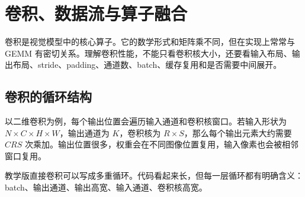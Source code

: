 \chapter{卷积、数据流与算子融合}

卷积是视觉模型中的核心算子。它的数学形式和矩阵乘不同，但在实现上常常与 GEMM 有密切关系。理解卷积性能，不能只看卷积核大小，还要看输入布局、输出布局、stride、padding、通道数、batch、缓存复用和是否需要中间展开。

\section{卷积的循环结构}

以二维卷积为例，每个输出位置会遍历输入通道和卷积核窗口。若输入形状为 $N \times C \times H \times W$，输出通道为 $K$，卷积核为 $R \times S$，那么每个输出元素大约需要 $C R S$ 次乘加。输出位置很多，权重会在不同图像位置复用，输入像素也会被相邻窗口复用。

教学版直接卷积可以写成多重循环。代码看起来长，但每一层循环都有明确含义：batch、输出通道、输出高宽、输入通道、卷积核高宽。

